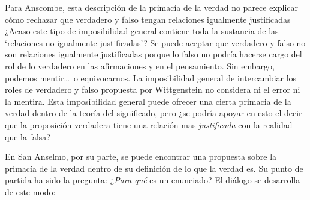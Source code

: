 Para Anscombe, esta descripción de la primacía de la verdad no parece explicar
cómo rechazar que verdadero y falso tengan relaciones igualmente justificadas
¿Acaso este tipo de imposibilidad general contiene toda la sustancia de las
`relaciones no igualmente justificadas'? Se puede aceptar que verdadero y falso
no son relaciones igualmente justificadas porque lo falso no podría hacerse
cargo del rol de lo verdadero en las afirmaciones y en el pensamiento. Sin
embargo, podemos mentir\ldots\, o equivocarnos. La imposibilidad general de
intercambiar los roles de verdadero y falso propuesta por Wittgenstein no
considera ni el error ni la mentira. Esta imposibilidad general puede ofrecer una
cierta primacia de la verdad dentro de la teoría del significado, pero ¿se
podría apoyar en esto el decir que la proposición verdadera tiene una relación
mas \emph{justificada} con la realidad que la falsa?

En San Anselmo, por su parte, se puede encontrar una propuesta sobre la primacía
de la verdad dentro de su definición de lo que la verdad es. Su punto de partida
ha sido la pregunta: ¿\emph{Para qué} es un enunciado? El diálogo se desarrolla
de este modo: 

